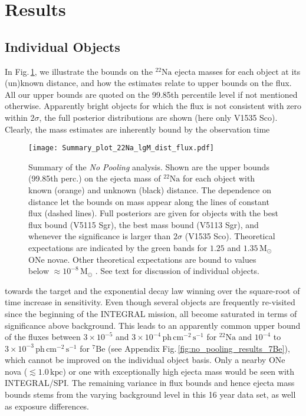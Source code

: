 \documentclass{aa}
\newcommand{\mrm}[1]{\mathrm{#1}}
\newcommand{\nuc}[2]{$\mrm{^{#2}#1}$}
\begin{document}
\section{Results}\label{sec:results}

\subsection{Individual Objects}\label{sec:individual_object_results}
%
In Fig.\,\ref{fig:no_pooling_results}, we illustrate the bounds on the \nuc{Na}{22} ejecta masses for each object at its (un)known distance, and how the estimates relate to upper bounds on the flux.
%
All our upper bounds are quoted on the 99.85th percentile level if not mentioned otherwise.
%
Apparently bright objects for which the flux is not consistent with zero within $2\sigma$, the full posterior distributions are shown (here only V1535 Sco).
%
Clearly, the mass estimates are inherently bound by the observation time
%
\begin{figure}[!hbtp]
	\centering
	\texttt{[image: Summary\_plot\_22Na\_lgM\_dist\_flux.pdf]}
	\caption{Summary of the \textit{No Pooling} analysis. Shown are the upper bounds (99.85th perc.) on the ejecta mass of \nuc{Na}{22} for each object with known (orange) and unknown (black) distance. The dependence on distance let the bounds on mass appear along the lines of constant flux (dashed lines). Full posteriors are given for objects with the best flux bound (V5115 Sgr), the best mass bound (V5113 Sgr), and whenever the significance is larger than $2\sigma$ (V1535 Sco). Theoretical expectations \citep{abcdefgh} are indicated by the green bands for $1.25$ and $1.35\,\mrm{M_{\odot}}$ ONe novae. Other theoretical expectations are bound to values below $\approx 10^{-8}\,\mrm{M_{\odot}}$ \citep[e.g.,][]{Jose1998_novae}. See text for discussion of individual objects.}
	\label{fig:no_pooling_results}
\end{figure}
%
towards the target and the exponential decay law winning over the square-root of time increase in sensitivity.
%
Even though several objects are frequently re-visited since the beginning of the INTEGRAL mission, all become saturated in terms of significance above background.
%
This leads to an apparently common upper bound of the fluxes between $3 \times 10^{-5}$ and $3 \times 10^{-4}\,\mathrm{ph\,cm^{-2}\,s^{-1}}$ for \nuc{Na}{22} and $10^{-4}$ to $3 \times 10^{-3}\,\mathrm{ph\,cm^{-2}\,s^{-1}}$ for \nuc{Be}{7} (see Appendix Fig.\,\ref{fig:no_pooling_results_7Be}), which cannot be improved on the individual object basis.
%
Only a nearby ONe nova ($\lesssim 1.0\,\mrm{kpc}$) or one with exceptionally high ejecta mass would be seen with INTEGRAL/SPI.
%
The remaining variance in flux bounds and hence ejecta mass bounds stems from the varying background level in this 16 year data set, as well as exposure differences.
\end{document}
